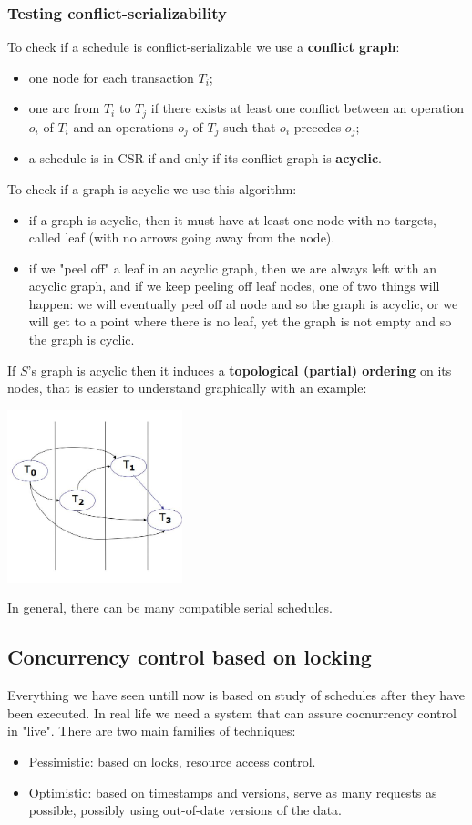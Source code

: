 \subsubsection{Testing conflict-serializability}
To check if a schedule is conflict-serializable we use a \textbf{conflict graph}:
\begin{itemize}
    \item one node for each transaction $T_i$;
    \item one arc from $T_i$ to $T_j$ if there exists at least one conflict between an operation $o_i$ of $T_i$ and an operations $o_j$ of $T_j$ such that $o_i$ precedes $o_j$;
    \item a schedule is in CSR if and only if its conflict graph is \textbf{acyclic}.
\end{itemize}
To check if a graph is acyclic we use this algorithm:
\begin{itemize}
    \item if a graph is acyclic, then it must have at least one node with no targets, called leaf (with no arrows going away from the node).
    \item if we "peel off" a leaf in an acyclic graph, then we are always left with an acyclic graph, and if we keep peeling off leaf nodes, one of two things will happen: we will eventually peel off al node and so the graph is acyclic, or we will get to a point where there is no leaf, yet the graph is not empty and so the graph is cyclic.
\end{itemize}
If $S$’s graph is acyclic then it induces a \textbf{topological (partial) ordering} on its nodes, that is easier to understand graphically with an example:
\begin{center}
    \includegraphics[height=5cm]{../arguments/topologicalpartialorderingCSR.JPG}
\end{center}
In general, there can be many compatible serial schedules.
\subsection{Concurrency control based on locking}
Everything we have seen untill now is based on study of schedules after they have been executed. In real life we need a system that can assure cocnurrency control in "live".\newline
There are two main families of techniques:
\begin{itemize}
    \item Pessimistic: based on locks, resource access control.
    \item Optimistic: based on timestamps and versions, serve as many requests as possible, possibly using out-of-date versions of the data.
\end{itemize}
